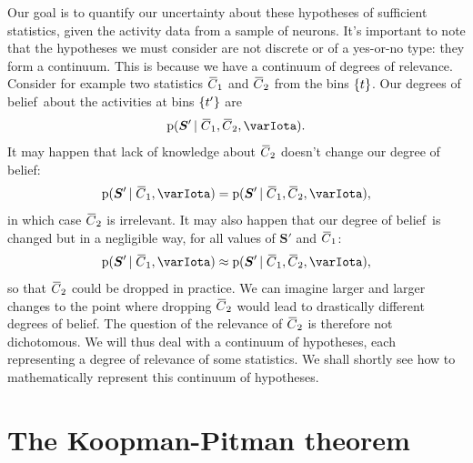 \documentclass[\ifafour a4paper,12pt,\else a5paper,10pt,\fi%
onecolumn,oneside,article,%
british%
]{memoir}
\theoremstyle{remark}
\theoremstyle{innote}
\DeclarePairedDelimiter\set{\{}{\}}
\newcommand*{\pf}{\mathrm{p}}%
\renewcommand*{\|}{\nonscript\,\vert\nonscript\;\mathopen{}}
\newcommand*{\widebar}[1]{{\mkern1.5mu\skew{2}\overline{\mkern-1.5mu#1\mkern-1.5mu}\mkern 1.5mu}}
\newcommand*{\dob}{degree of belief}
\newcommand*{\dobs}{degrees of belief}
\newcommand*{\yS}{S}
\newcommand*{\ySt}{\bm{\yS}}
\newcommand*{\ycc}{\widebar{C}}
\newcommand*{\yI}{\varIota}
\newcommand*{\ya}{\ycc}
\begin{document}
\bigskip

Our goal is to quantify our uncertainty about these hypotheses of
sufficient statistics, given the activity data from a sample of neurons.
It's important to note that the hypotheses we must consider are not
discrete or of a yes-or-no type: they form a continuum. This is because we
have a continuum of degrees of relevance. Consider for example two
statistics $\ya_1$ and $\ya_2$ from the bins $\set{t}$. Our \dobs\ about
the activities at bins $\set{t'}$ are
\begin{equation}
  \label{eq:continuum_stat_example}
  \pf(\ySt' \| \ya_1, \ya_2, \yI).
\end{equation}
It may happen that lack of knowledge about $\ya_2$ doesn't change our \dob:
\begin{equation}
  \label{eq:continuum_stat_example_irrel}
  \pf(\ySt' \| \ya_1, \yI) =
  \pf(\ySt' \| \ya_1, \ya_2, \yI),
\end{equation}
in which case $\ya_2$ is irrelevant. It may also happen that our \dob\ is
changed but in a negligible way, for all values of $\ySt'$ and $\ya_1$:
\begin{equation}
  \label{eq:continuum_stat_example_irrel_slightly}
  \pf(\ySt' \| \ya_1, \yI) \approx
  \pf(\ySt' \| \ya_1, \ya_2, \yI),
\end{equation}
so that $\ya_2$ could be dropped in practice. We can imagine larger and
larger changes to the point where dropping $\ya_2$ would lead to
drastically different \dobs. The question of the relevance of $\ya_2$ is
therefore not dichotomous. We will thus deal with a continuum of
hypotheses, each representing a degree of relevance of some statistics. We
shall shortly see how to mathematically represent this continuum of
hypotheses.

\section{The Koopman-Pitman theorem}
\label{sec:koopman-pitman}
\end{document}
